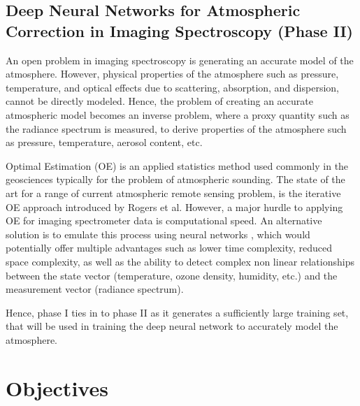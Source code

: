 \documentclass{article}
\begin{document}
\begin{multicols*}{2}
\subsection{Deep Neural Networks for Atmospheric Correction in Imaging Spectroscopy (Phase II)}

An open problem in imaging spectroscopy is generating an accurate model of the atmosphere. However, physical properties of the atmosphere such as pressure, temperature, and optical effects due to scattering, absorption, and dispersion, cannot be directly modeled. Hence, the problem of creating an accurate atmospheric model becomes an inverse problem, where a proxy quantity such as the radiance spectrum is measured, to derive properties of the atmosphere such as pressure, temperature, aerosol content, etc.

Optimal Estimation (OE) is an applied statistics method used commonly in the geosciences typically for the problem of atmospheric sounding. The state of the art for a range of current atmospheric remote sensing problem, is the iterative OE approach introduced by Rogers et al. \cite{rogers} However, a major hurdle to applying OE for imaging spectrometer data is computational speed. An alternative solution is to emulate this process using neural networks \cite{DRT-NN}, which would potentially offer multiple advantages such as lower time complexity, reduced space complexity, as well as the ability to detect complex non linear relationships between the state vector (temperature, ozone density, humidity, etc.) and the measurement vector (radiance spectrum).

Hence, phase I ties in to phase II as it generates a sufficiently large training set, that will be used in training the deep neural network to accurately model the atmosphere.
\section{Objectives}

\end{multicols*}
\end{document}
